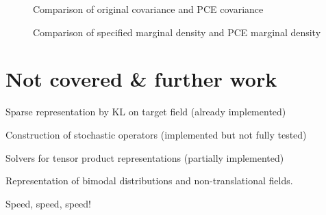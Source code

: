 \documentclass{article}
\begin{document}
\begin{figure}[h]
  \caption{Comparison of original covariance and PCE covariance}
\end{figure}

\begin{figure}[h]
  \caption{Comparison of specified marginal density and PCE marginal density}
\end{figure}



{\newpage}

\section{Not covered \& further work}



Sparse representation by KL on target field (already implemented)



Construction of stochastic operators (implemented but not fully tested)



Solvers for tensor product representations (partially implemented)



Representation of bimodal distributions and non-translational fields.



Speed, speed, speed!
\end{document}
